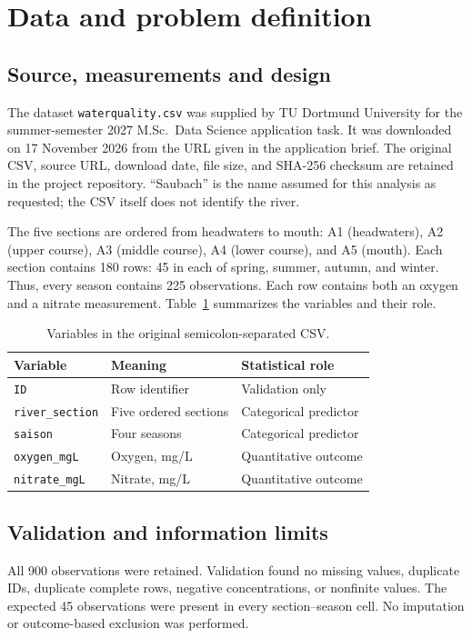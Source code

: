 \section{Data and problem definition}\label{sec:data}
\subsection{Source, measurements and design}
The dataset \texttt{waterquality.csv} was supplied by TU Dortmund University for the summer-semester 2027 M.Sc.\ Data Science application task. It was downloaded on 17 November 2026 from the URL given in the application brief. The original CSV, source URL, download date, file size, and SHA-256 checksum are retained in the project repository. ``Saubach'' is the name assumed for this analysis as requested; the CSV itself does not identify the river.

The five sections are ordered from headwaters to mouth: A1 (headwaters), A2 (upper course), A3 (middle course), A4 (lower course), and A5 (mouth). Each section contains 180 rows: 45 in each of spring, summer, autumn, and winter. Thus, every season contains 225 observations. Each row contains both an oxygen and a nitrate measurement. Table~\ref{tab:variables} summarizes the variables and their role.

\begin{table}[H]
\centering\small\singlespacing
\begin{tabular}{lll}
\toprule
Variable & Meaning & Statistical role \\
\midrule
\texttt{ID} & Row identifier & Validation only \\
\texttt{river\_section} & Five ordered sections & Categorical predictor \\
\texttt{saison} & Four seasons & Categorical predictor \\
\texttt{oxygen\_mgL} & Oxygen, mg/L & Quantitative outcome \\
\texttt{nitrate\_mgL} & Nitrate, mg/L & Quantitative outcome \\
\bottomrule
\end{tabular}
\caption{Variables in the original semicolon-separated CSV.}\label{tab:variables}
\end{table}

\subsection{Validation and information limits}
All 900 observations were retained. Validation found no missing values, duplicate IDs, duplicate complete rows, negative concentrations, or nonfinite values. The expected 45 observations were present in every section--season cell. No imputation or outcome-based exclusion was performed.

